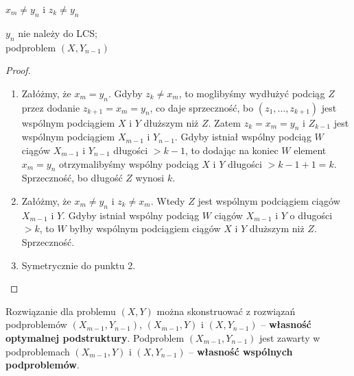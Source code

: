 \begin{azfigure}
\begin{minipage}[t]{0.31\textwidth}
		\par\smallskip
		{\footnotesize $x_m \neq y_n$ i $z_k \neq y_n$\par
			$y_n$ nie należy do LCS; \\ podproblem $(X, Y_{n-1})$}
	\end{minipage}
	\caption{Trzy przypadki lematu o~optymalnej podstrukturze LCS. Żółta komórka --
		dopasowany ostatni element ($x_m = y_n$), który wchodzi do LCS; szara,
		przekreślona komórka -- element odrzucony, nienależący do tego LCS;
		przerywana pomarańczowa ramka -- podproblem(y), do których redukuje się zadanie.}
	\label{fig:lcs:cases}
\end{azfigure}

\begin{proof} ~
	\begin{enumerate}
		\item Załóżmy, że $x_m = y_n$. Gdyby $z_k \neq x_m$, to moglibyśmy wydłużyć podciąg $Z$ przez dodanie $z_{k+1} = x_m = y_n$, co daje sprzeczność, bo $(z_1, \dots, z_{k+1})$ jest wspólnym podciągiem $X$ i $Y$ dłuższym niż $Z$. Zatem $z_k = x_m = y_n$ i $Z_{k-1}$ jest wspólnym podciągiem $X_{m-1}$ i $Y_{n-1}$. Gdyby istniał wspólny podciąg $W$ ciągów $X_{m-1}$ i $Y_{n-1}$ długości $> k - 1$, to dodając na koniec $W$ element $x_m = y_n$ otrzymalibyśmy wspólny podciąg $X$ i $Y$ długości $> k - 1 + 1 = k$. Sprzeczność, bo długość $Z$ wynosi $k$.
		\item Załóżmy, że $x_m \neq y_n$ i $z_k \neq x_m$. Wtedy $Z$ jest wspólnym podciągiem ciągów $X_{m-1}$ i $Y$. Gdyby istniał wspólny podciąg $W$ ciągów $X_{m-1}$ i $Y$ o długości $> k$, to $W$ byłby wspólnym podciągiem ciągów $X$ i $Y$ dłuższym niż $Z$. Sprzeczność.
		\item Symetrycznie do punktu 2.
	\end{enumerate}
\end{proof}

Rozwiązanie dla problemu $(X, Y)$ można skonstruować z rozwiązań podproblemów $(X_{m-1}, Y_{n-1})$, $(X_{m-1}, Y)$ i $(X, Y_{n-1})$ -- \textbf{własność optymalnej podstruktury}.
Podproblem $(X_{m-1}, Y_{n-1})$ jest zawarty w podproblemach $(X_{m-1}, Y)$ i $(X, Y_{n-1})$ -- \textbf{własność wspólnych podproblemów}.

